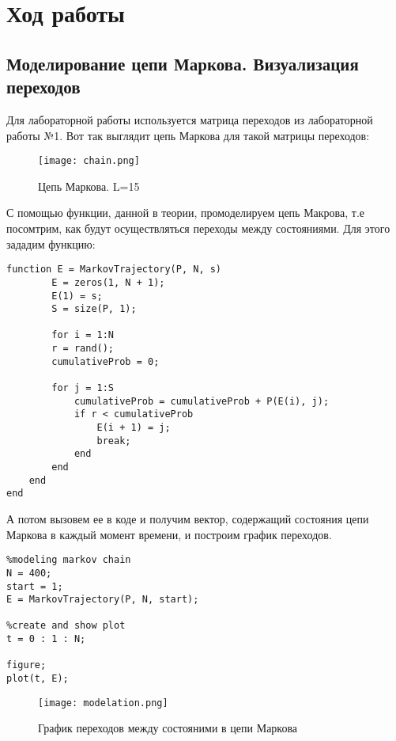 \chapter{Ход работы}
\label{ch:chap2}

\section*{\textbf{Моделирование цепи Маркова. Визуализация переходов}}

Для лабораторной работы используется матрица переходов из лабораторной работы №1. Вот так выглядит цепь Маркова для такой матрицы
переходов:

\begin{figure}[H]
    \centering
    \texttt{[image: chain.png]}
    \caption{Цепь Маркова. L=15}
\end{figure}

С помощью функции, данной в теории, промоделируем цепь Макрова, т.е посомтрим, как будут осуществляться переходы между состояниями.
Для этого зададим функцию:

\begin{lstlisting}
function E = MarkovTrajectory(P, N, s)        
        E = zeros(1, N + 1);
        E(1) = s;  
        S = size(P, 1); 
        
        for i = 1:N
        r = rand();
        cumulativeProb = 0;
        
        for j = 1:S
            cumulativeProb = cumulativeProb + P(E(i), j);
            if r < cumulativeProb
                E(i + 1) = j;
                break;
            end
        end
    end
end
\end{lstlisting}

А потом вызовем ее в коде и получим вектор, содержащий состояния цепи Маркова в каждый момент времени, и построим график переходов.

\begin{lstlisting}
%modeling markov chain
N = 400;
start = 1;
E = MarkovTrajectory(P, N, start);

%create and show plot
t = 0 : 1 : N;

figure;
plot(t, E);
\end{lstlisting}

\begin{figure}[H]
    \centering
    \texttt{[image: modelation.png]}
    \caption{График переходов между состояними в цепи Маркова}
\end{figure}

